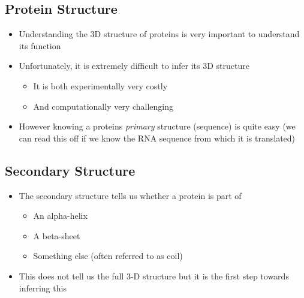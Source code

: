\begin{slide}
\section{Protein Structure}

\begin{PauseHighLight}
  \begin{itemize}
  \item Understanding the 3D structure of proteins is very important to
    understand its function\pause
  \item Unfortunately, it is extremely difficult to infer its 3D
    structure\pause
    \begin{itemize}
    \item It is both experimentally very costly\pause
    \item And computationally very challenging\pause
    \end{itemize}
  \item However knowing a proteins \emph{primary} structure (sequence)
    is quite easy (we can read this off if we know the RNA sequence from
    which it is translated)\pause
  \end{itemize}
\end{PauseHighLight}

\end{slide}


\begin{slide}
\section{Secondary Structure}

\begin{PauseHighLight}
  \begin{itemize}
  \item The secondary structure tells us whether a protein is part of
    \begin{itemize}
    \item An alpha-helix
    \item A beta-sheet
    \item Something else (often referred to as coil)\pause
    \end{itemize}
  \item This does not tell us the full 3-D structure but it is the first
    step towards inferring this\pause
  \end{itemize}
\end{PauseHighLight}

\end{slide}

